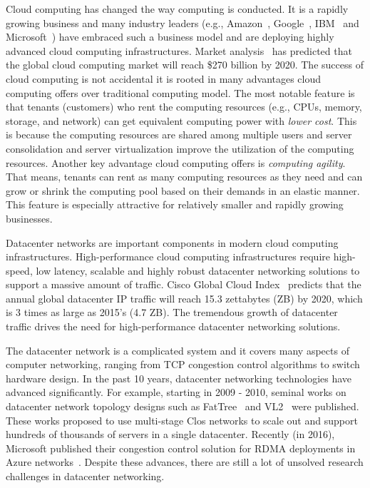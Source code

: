 
Cloud computing has changed the way computing is conducted.
It is a rapidly growing business and many industry leaders
(e.g., Amazon~\cite{amazon-aws}, Google~\cite{google-compute}, 
IBM~\cite{ibm-softlayer,ibm-bluemix} and
Microsoft~\cite{microsoft-azure}) have embraced such a
business model and are deploying highly advanced cloud computing infrastructures.
Market analysis~\cite{cloud-market2020}
has predicted that the global cloud computing market will
reach \$270 billion by 2020. The success of cloud computing is
not accidental \textemdash\xspace it is rooted in many advantages cloud computing offers
over traditional computing model. The most notable feature is that tenants
(customers) who rent the computing resources (e.g., CPUs, memory, storage, and network) can get equivalent computing power
with \emph{lower cost}. This is because the computing resources are shared among multiple users and
server consolidation and server virtualization improve the utilization
of the computing resources. Another key advantage cloud computing offers
is \emph{computing agility}. That means, tenants can rent as many computing
resources as they need and can grow or shrink the computing pool based on their demands 
in an elastic manner.
This feature is especially attractive for relatively smaller and
rapidly growing businesses.

Datacenter networks are important components in modern cloud computing infrastructures. 
High-performance cloud computing infrastructures require high-speed, low latency, scalable and 
highly robust datacenter networking solutions to support a massive amount of traffic. 
Cisco Global Cloud Index~\cite{cisco-predict} predicts that the annual global datacenter IP traffic will 
reach 15.3 zettabytes (ZB) by 2020, which is 3 times as large as 2015's (4.7 ZB). 
The tremendous growth of datacenter traffic drives the need for high-performance 
datacenter networking solutions. 

The datacenter network is a complicated system and it covers many 
aspects of computer networking, ranging from TCP congestion control algorithms to switch hardware design. 
In the past 10 years, datacenter networking technologies have advanced significantly. 
For example, starting in 2009 - 2010, seminal works on datacenter network topology designs such as 
FatTree~\cite{fattree} and VL2~\cite{vl2} were published. 
These works proposed to use multi-stage Clos networks to 
scale out and support hundreds of thousands of servers in a single datacenter. 
Recently (in 2016), Microsoft published their congestion control solution for 
RDMA deployments in Azure networks~\cite{zhu2015congestion}. 
Despite these advances, there are still a lot of unsolved research challenges in datacenter networking.

